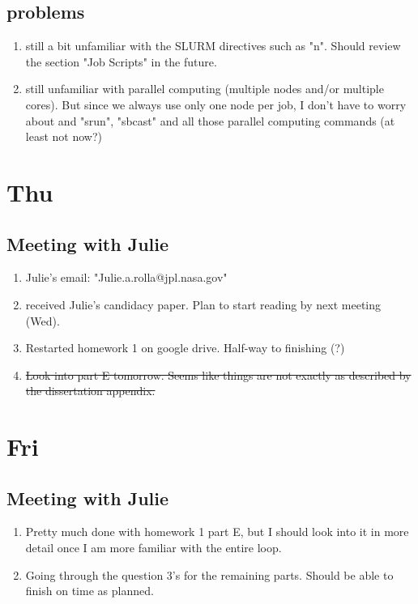\documentclass[12pt,letterpaper]{article}
\begin{document}
\subsection{problems}
\begin{enumerate}
  \item still a bit unfamiliar with the SLURM directives such as "n". Should review
    the section "Job Scripts" in the future.
  \item still unfamiliar with parallel computing (multiple nodes and/or multiple cores).
    But since we always use only one node per job, I don't have to worry about
    and "srun", "sbcast" and all those parallel computing commands
    (at least not now?)
  
\end{enumerate}


\section{Thu}
\subsection{Meeting with Julie}
\begin{enumerate}
  \item Julie's email: "Julie.a.rolla@jpl.nasa.gov"
  \item received Julie's candidacy paper. Plan to start reading by next meeting (Wed).
  \item Restarted homework 1 on google drive. Half-way to finishing (?)
  \item \st{Look into part E tomorrow. Seems like things are not exactly as
    described by the dissertation appendix.}
\end{enumerate}



\section{Fri}
\subsection{Meeting with Julie}
\begin{enumerate}
  \item Pretty much done with homework 1 part E, but I should look into it in more
    detail once I am more familiar with the entire loop.
  \item Going through the question 3's for the remaining parts. Should be able to 
    finish on time as planned.
\end{enumerate}
\end{document}
